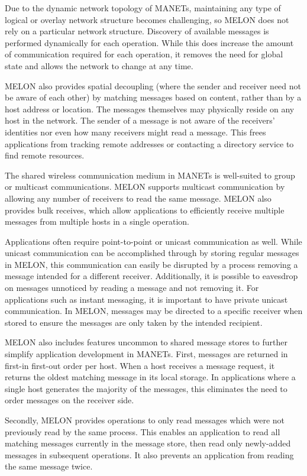 \documentclass[lnicst]{svmultln}
\begin{document}
Due to the dynamic network topology of MANETs, maintaining any type of logical or overlay network structure becomes challenging, so MELON does not rely on a particular network structure. Discovery of available messages is performed dynamically for each operation. While this does increase the amount of communication required for each operation, it removes the need for global state and allows the network to change at any time.

MELON also provides spatial decoupling (where the sender and receiver need not be aware of each other) by matching messages based on content, rather than by a host address or location. The messages themselves may physically reside on any host in the network. The sender of a message is not aware of the receivers' identities nor even how many receivers might read a message. This frees applications from tracking remote addresses or contacting a directory service to find remote resources.

The shared wireless communication medium in MANETs is well-suited to group or multicast communications. MELON supports multicast communication by allowing any number of receivers to read the same message. MELON also provides bulk receives, which allow applications to efficiently receive multiple messages from multiple hosts in a single operation.

Applications often require point-to-point or unicast communication as well. While unicast communication can be accomplished through by storing regular messages in MELON, this communication can easily be disrupted by a process removing a message intended for a different receiver. Additionally, it is possible to eavesdrop on messages unnoticed by reading a message and not removing it. For applications such as instant messaging, it is important to have private unicast communication. In MELON, messages may be directed to a specific receiver when stored to ensure the messages are only taken by the intended recipient.

MELON also includes features uncommon to shared message stores to further simplify application development in MANETs. First, messages are returned in first-in first-out order per host. When a host receives a message request, it returns the oldest matching message in its local storage. In applications where a single host generates the majority of the messages, this eliminates the need to order messages on the receiver side. 

Secondly, MELON provides operations to only read messages which were not previously read by the same process. This enables an application to read all matching messages currently in the message store, then read only newly-added messages in subsequent operations. It also prevents an application from reading the same message twice.
\end{document}
